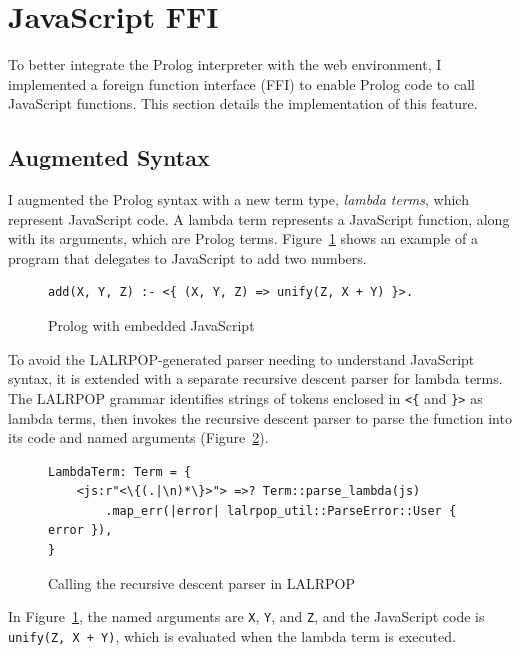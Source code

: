 
\section{JavaScript FFI}

\label{sec:js-ffi}

To better integrate the Prolog interpreter with the web environment, I implemented a foreign function interface (FFI) to enable Prolog code to call JavaScript functions. This section details the implementation of this feature.

\subsection{Augmented Syntax}

I augmented the Prolog syntax with a new term type, \emph{lambda terms}, which represent JavaScript code. A lambda term represents a JavaScript function, along with its arguments, which are Prolog terms. Figure~\ref{fig:js-in-prolog} shows an example of a program that delegates to JavaScript to add two numbers.

\begin{figure}[H]
\centering
\begin{verbatim}
add(X, Y, Z) :- <{ (X, Y, Z) => unify(Z, X + Y) }>.
\end{verbatim}
\caption{Prolog with embedded JavaScript}
\label{fig:js-in-prolog}
\end{figure}

To avoid the LALRPOP-generated parser needing to understand JavaScript syntax, it is extended with a separate recursive descent parser for lambda terms. The LALRPOP grammar identifies strings of tokens enclosed in \texttt{<\{} and \texttt{\}>} as lambda terms, then invokes the recursive descent parser to parse the function into its code and named arguments (Figure~\ref{fig:js-grammar}).

\begin{figure}[H]
\centering
\begin{verbatim}
LambdaTerm: Term = {
    <js:r"<\{(.|\n)*\}>"> =>? Term::parse_lambda(js)
        .map_err(|error| lalrpop_util::ParseError::User { error }),
}
\end{verbatim}
\caption{Calling the recursive descent parser in LALRPOP}
\label{fig:js-grammar}
\end{figure}

In Figure~\ref{fig:js-in-prolog}, the named arguments are \texttt{X}, \texttt{Y}, and \texttt{Z}, and the JavaScript code is \texttt{unify(Z, X + Y)}, which is evaluated when the lambda term is executed.

